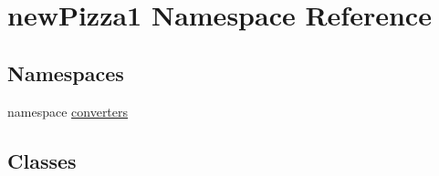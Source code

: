 \hypertarget{namespacenewPizza1}{}\section{new\+Pizza1 Namespace Reference}
\label{namespacenewPizza1}
\subsection*{Namespaces}
\begin{DoxyCompactItemize}
\item 
namespace \hyperlink{namespacenewPizza1_1_1converters}{converters}
\end{DoxyCompactItemize}
\subsection*{Classes}
